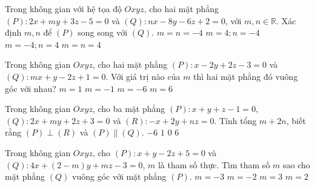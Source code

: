 \begin{ex}%
	Trong không gian với hệ tọa độ $Oxyz$, cho hai mặt phẳng $(P)\colon 2x+my+3z-5=0$ và $(Q)\colon nx-8y-6z+2=0$, với $m,n\in \mathbb{R}$. Xác định $m,n$ để $(P)$ song song với $(Q)$.
\choice
{$m=n=-4$}
{\True $m=4;n=-4$}
{$m=- 4;n=4$}
{$m=n=4$}
\end{ex}

\begin{ex}%
	Trong không gian $Oxyz$, cho hai mặt phẳng $(P)\colon x-2y+2z-3=0$ và $(Q)\colon mx+y-2z+1=0$. Với giá trị nào của $m$ thì hai mặt phẳng đó vuông góc với nhau?
\choice
{$m=1$}
{$m=-1$}
{$m=-6$}
{\True $m=6$}
\end{ex}

\begin{ex}%
	Trong không gian $Oxyz$, cho ba mặt phẳng $(P)\colon x+y+z-1=0$, $(Q)\colon 2x+my+2z+3=0$ và $(R)\colon -x+2y+nz=0$. Tính tổng $m+2n$, biết rằng $(P)\perp (R)$ và $(P)\parallel (Q)$.
\choice
{$-6$}
{$1$}
{\True $0$}
{$6$}
\end{ex}

\begin{ex}%
	Trong không gian $Oxyz$, cho $(P)\colon x+y-2z+5=0$ và $(Q)\colon 4x+(2-m)y+mz-3=0$, $m$ là tham số thực. Tìm tham số $m$ sao cho mặt phẳng $(Q)$ vuông góc với mặt phẳng $(P)$.
\choice
{$m=-3$}
{$m=-2$}
{$m=3$}
{\True $m=2$}
\end{ex}

